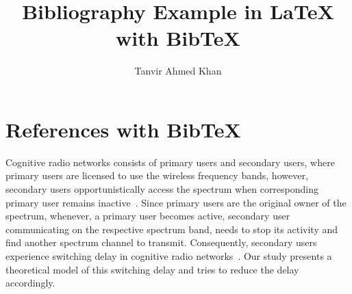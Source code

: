 \documentclass{article}
\title{Bibliography Example in \LaTeX{} with BibTeX}
\author{Tanvir Ahmed Khan}
\begin{document}
\maketitle
\section{References with BibTeX}
Cognitive radio networks consists of primary users and secondary users, where primary users are licensed to use the wireless frequency bands, however, secondary users opportunistically  access the spectrum when corresponding primary user remains inactive~\cite{akyildiz2008survey}. Since primary users are the original owner of the spectrum, whenever, a primary user becomes active, secondary user communicating on the respective spectrum band, needs to stop its activity and find another spectrum channel to transmit. Consequently, secondary users experience switching delay in cognitive radio networks~\cite{wang10infocom}. Our study presents a theoretical model of this switching delay and tries to reduce the delay accordingly.


\end{document}
